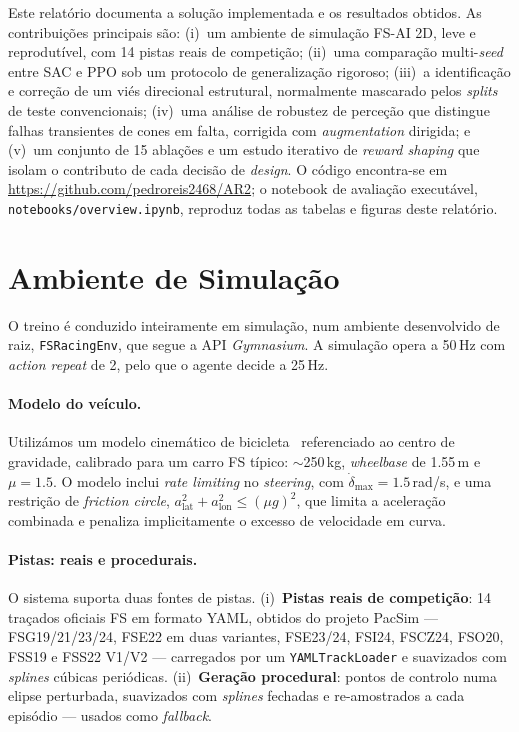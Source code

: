 \documentclass[runningheads]{llncs}
\begin{document}
Este relatório documenta a solução implementada e os resultados obtidos. As contribuições principais são: (i)~um ambiente de simulação FS-AI 2D, leve e reprodutível, com 14 pistas reais de competição; (ii)~uma comparação multi-\textit{seed} entre SAC e PPO sob um protocolo de generalização rigoroso; (iii)~a identificação e correção de um viés direcional estrutural, normalmente mascarado pelos \textit{splits} de teste convencionais; (iv)~uma análise de robustez de perceção que distingue falhas transientes de cones em falta, corrigida com \textit{augmentation} dirigida; e (v)~um conjunto de 15 ablações e um estudo iterativo de \textit{reward shaping} que isolam o contributo de cada decisão de \textit{design}. O código encontra-se em \url{https://github.com/pedroreis2468/AR2}; o notebook de avaliação executável, \texttt{notebooks/overview.ipynb}, reproduz todas as tabelas e figuras deste relatório.

\section{Ambiente de Simulação}

O treino é conduzido inteiramente em simulação, num ambiente desenvolvido de raiz, \texttt{FSRacingEnv}, que segue a API \textit{Gymnasium}. A simulação opera a 50\,Hz com \textit{action repeat} de 2, pelo que o agente decide a 25\,Hz.

\paragraph{Modelo do veículo.} Utilizámos um modelo cinemático de bicicleta~\cite{kong2015} referenciado ao centro de gravidade, calibrado para um carro FS típico: $\sim$250\,kg, \textit{wheelbase} de 1.55\,m e $\mu = 1.5$. O modelo inclui \textit{rate limiting} no \textit{steering}, com $\dot{\delta}_{\max}=1.5$\,rad/s, e uma restrição de \textit{friction circle}, $a_\mathrm{lat}^2 + a_\mathrm{lon}^2 \leq (\mu g)^2$, que limita a aceleração combinada e penaliza implicitamente o excesso de velocidade em curva.

\paragraph{Pistas: reais e procedurais.} O sistema suporta duas fontes de pistas. (i)~\textbf{Pistas reais de competição}: 14 traçados oficiais FS em formato YAML, obtidos do projeto PacSim --- FSG19/21/23/24, FSE22 em duas variantes, FSE23/24, FSI24, FSCZ24, FSO20, FSS19 e FSS22 V1/V2 --- carregados por um \texttt{YAMLTrackLoader} e suavizados com \textit{splines} cúbicas periódicas. (ii)~\textbf{Geração procedural}: pontos de controlo numa elipse perturbada, suavizados com \textit{splines} fechadas e re-amostrados a cada episódio --- usados como \textit{fallback}.
\end{document}
